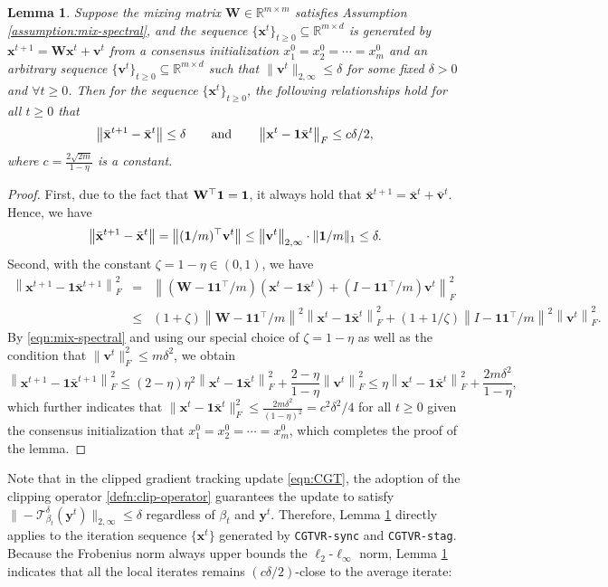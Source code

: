 \documentclass{article}
\newtheorem{lemma}[theorem]{Lemma}
\newcommand{\ctdb}{\mathcal{T}^\delta_{\beta_t}}
\newcommand{\bxt}{\mathbf{x}^t}
\newcommand{\bvt}{\mathbf{v}^t}
\newcommand{\bxte}{\mathbf{x}^{t+1}}
\newcommand{\byt}{\mathbf{y}^t}
\newcommand{\bbxt}{\bar{\mathbf{x}}^t}
\newcommand{\bbxte}{\bar{\mathbf{x}}^{t+1}}
\newcommand{\bbvt}{\bar{\mathbf{v}}^{t}}
\newcommand{\RR}{\mathbb{R}}
\newcommand{\bW}{\mathbf{W}}
\newcommand{\bone}{\mathbf{1}}
\newcommand{\lnorm}{\left\|}
\newcommand{\rnorm}{\right\|}
\begin{document}
\begin{lemma}
    \label{lemma:clip-distance2mean}
    Suppose the mixing matrix $\bW\in\RR^{m\times m}$ satisfies Assumption \ref{assumption:mix-spectral}, and the sequence $\{\bxt\}_{t\geq0}\subseteq\RR^{m\times d}$ is generated by $\bxte = \bW\bxt + \bvt$ from a consensus initialization $x_1^0 =x_2^0= \cdots = x_m^0$ and an arbitrary sequence $\{\bvt\}_{t\geq0}\subseteq\RR^{m\times d}$ such that $\|\bvt\|_{2,\infty}\leq \delta$ for some fixed $\delta>0$ and $\forall t\geq0$. Then for the sequence $\{\bxt\}_{t\geq0}$, the following relationships hold for all $t\geq0$ that
    $$\lnorm\bbxte-\bbxt\rnorm \leq \delta\qquad\mbox{and}\qquad\lnorm\bxt-{\bf 1}\bbxt\rnorm_{F}\leq {c\delta}/{2},$$
    where $c = \frac{2\sqrt{2m}}{1-\eta}$ is a constant.  
\end{lemma}
\begin{proof}
    First, due to the fact that $\bW^\top{\bf 1}={\bf 1}$, it always hold that $\bbxte = \bbxt + \bbvt.$ Hence,  we have
    $$\left\|\bbxte-\bbxt\right\| = \left\|({\bf 1}/m)^\top \bvt\right\| \leq \left\|\bvt\right\|_{2,\infty}\cdot\|{\bf 1}/m\|_1 \leq \delta.$$
    Second, with the constant $\zeta = 1-\eta\in(0,1)$, we have 
    \begin{eqnarray*}
        \lnorm\bxte-\bone\bbxte\rnorm^2_F &=& \lnorm\left(\bW-\bone\bone^\top/m\right)\left(\bxt-\bone\bbxt\right) + \left(I-\bone\bone^\top/m\right)\bvt\rnorm_F^2 \\
        & \leq & (1+\zeta)\lnorm \bW-\bone\bone^\top/m\rnorm^2\lnorm\bxt-\bone\bbxt\rnorm_F^2 + (1+1/\zeta)\lnorm I-\bone\bone^\top/m\rnorm^2\lnorm\bvt\rnorm_F^2.
    \end{eqnarray*}   
    By \eqref{eqn:mix-spectral} and using our special choice of $\zeta = 1-\eta$ as well as the condition that $\|\bvt\|^2_F\leq m\delta^2$, we obtain
    $$\lnorm\bxte-\bone\bbxte\rnorm^2_F\leq (2-\eta)\eta^2\lnorm\bxt-\bone\bbxt\rnorm_F^2 + \frac{2-\eta}{1-\eta}\lnorm\bvt\rnorm_F^2 \leq  \eta\lnorm\bxt-\bone\bbxt\rnorm_F^2 + \frac{2m\delta^2}{1-\eta},$$
    which further indicates that 
    $\|\bxt-\bone\bbxt\|^2_F \leq \frac{2m\delta^2}{(1-\eta)^2}= c^2\delta^2/4$ for all $t\geq0$ given the consensus initialization that $x_1^0=x_2^0=\cdots=x_m^0$, which completes the proof of the lemma. 
\end{proof}
Note that in the clipped gradient tracking update \eqref{eqn:CGT}, the adoption of the clipping operator \eqref{defn:clip-operator} guarantees the update to satisfy $\|-\ctdb(\byt)\|_{2,\infty}\leq \delta$  regardless of $\beta_t$ and $\byt$. Therefore, Lemma \ref{lemma:clip-distance2mean} directly applies to the iteration sequence $\{\bxt\}$ generated by \texttt{CGTVR-sync} and \texttt{CGTVR-stag}. Because the Frobenius norm always upper bounds the $\ell_2$-$\ell_\infty$ norm, Lemma \ref{lemma:clip-distance2mean}  indicates that all the local iterates remains $(c\delta/2)$-close to the average iterate:
\end{document}
